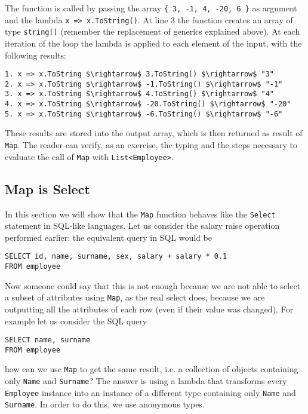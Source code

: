 The function is called by passing the array \texttt{\{ 3, -1, 4, -20, 6 \}} as argument and the lambda \texttt{x => x.ToString()}. At line 3 the function creates an array of type \texttt{string[]} (remember the replacement of generics explained above). At each iteration of the loop the lambda is applied to each element of the input, with the following results:

\begin{lstlisting}[mathescape = true]
1. x => x.ToString $\rightarrow$ 3.ToString() $\rightarrow$ "3"
2. x => x.ToString $\rightarrow$ -1.ToString() $\rightarrow$ "-1"
3. x => x.ToString $\rightarrow$ 4.ToString() $\rightarrow$ "4"
4. x => x.ToString $\rightarrow$ -20.ToString() $\rightarrow$ "-20"
5. x => x.ToString $\rightarrow$ -6.ToString() $\rightarrow$ "-6"
\end{lstlisting}

\noindent
These results are stored into the output array, which is then returned as result of \texttt{Map}. The reader can verify, as an exercise, the typing and the steps necessary to evaluate the call of \texttt{Map} with \texttt{List<Employee>}.

\subsection{Map is Select}
\label{subsec:select}
In this section we will show that the \texttt{Map} function behaves like the \texttt{Select} statement in SQL-like languages. Let us consider the salary raise operation performed earlier: the equivalent query in SQL would be

\begin{lstlisting}
SELECT id, name, surname, sex, salary + salary * 0.1
FROM employee
\end{lstlisting}

\noindent
Now someone could say that this is not enough because we are not able to select a subset of attributes using \texttt{Map}, as the real select does, because we are outputting all the attributes of each row (even if their value was changed). For example let us consider the SQL query

\begin{lstlisting}
SELECT name, surname
FROM employee
\end{lstlisting}

\noindent
how can we use \texttt{Map} to get the same result, i.e. a collection of objects containing only \texttt{Name} and \texttt{Surname}? The answer is using a lambda that transforms every \texttt{Employee} instance into an instance of a different type containing only \texttt{Name} and \texttt{Surname}. In order to do this, we use anonymous types.

